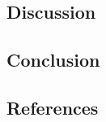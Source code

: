 \documentclass[
]{article}
\begin{document}
\hypertarget{discussion}{%
\subsection{Discussion}\label{discussion}}

\hypertarget{conclusion}{%
\subsection{Conclusion}\label{conclusion}}

\hypertarget{references}{%
\subsection{References}\label{references}}
\end{document}
